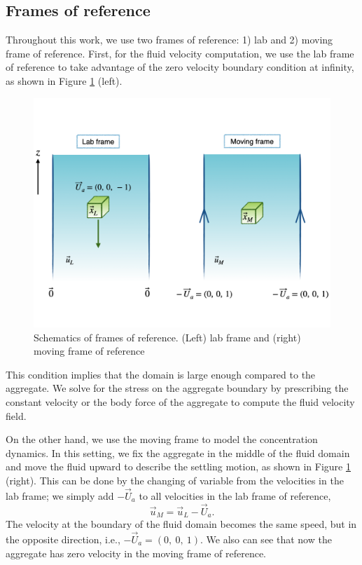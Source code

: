 \subsection{Frames of reference}
Throughout this work, we use two frames of reference: 1) lab and 2) moving frame of reference. First, for the fluid velocity computation, we use the lab frame of reference to take advantage of the zero velocity boundary condition at infinity, as shown in Figure \ref{fig_frame_ref} (left). 
\begin{figure}[h]
	\begin{center}
		\includegraphics[scale=0.4]{figures/fig_frame_ref}
	\end{center}
	\caption{Schematics of frames of reference. (Left) lab frame and (right) moving frame of reference }
	\label{fig_frame_ref}
\end{figure}
This condition implies that the domain is large enough compared to the aggregate.
We solve for the stress on the aggregate boundary by prescribing the constant velocity or the body force of the aggregate to compute the fluid velocity field. 
\par
On the other hand, we use the moving frame to model the concentration dynamics.
In this setting, we fix the aggregate in the middle of the fluid domain and move the fluid upward to describe the settling motion, as shown in Figure \ref{fig_frame_ref} (right).
This can be done by the changing of variable from the velocities in the lab frame; we simply add $-\vec{U}_a$ to all velocities in the lab frame of reference,
\[
\vec{u}_M = \vec{u}_L - \vec{U}_a.
\]
 The velocity at the boundary of the fluid domain becomes the same speed, but in the opposite direction, i.e., $-\vec{U}_a = (0, \ 0, \ 1)$. We also can see that now the aggregate has zero velocity in the moving frame of reference.

